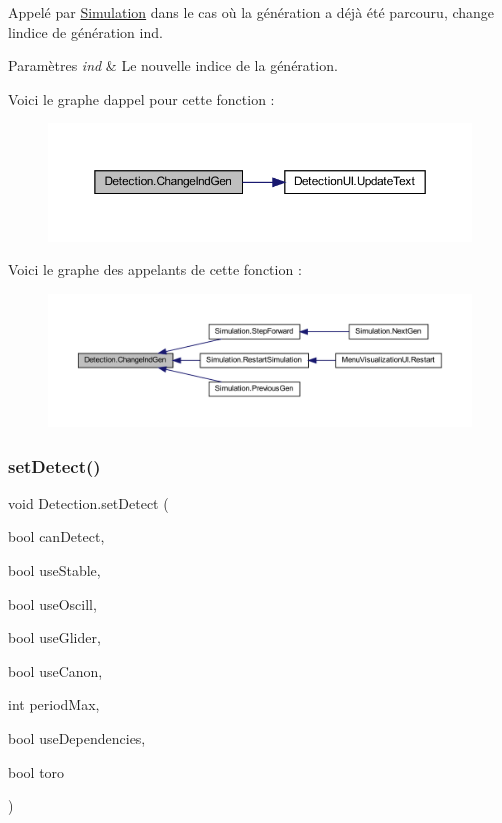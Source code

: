 Appelé par \mbox{\hyperlink{class_simulation}{Simulation}} dans le cas où la génération a déjà été parcouru, change l\textquotesingle{}indice de génération ind. 


\begin{DoxyParams}{Paramètres}
{\em ind} & Le nouvelle indice de la génération.\\
\hline
\end{DoxyParams}
Voici le graphe d\textquotesingle{}appel pour cette fonction \+:
\nopagebreak
\begin{figure}[H]
\begin{center}
\leavevmode
\includegraphics[width=350pt]{class_detection_a70084049883e8e2ebecce5d24e84a196_cgraph}
\end{center}
\end{figure}
Voici le graphe des appelants de cette fonction \+:
\nopagebreak
\begin{figure}[H]
\begin{center}
\leavevmode
\includegraphics[width=350pt]{class_detection_a70084049883e8e2ebecce5d24e84a196_icgraph}
\end{center}
\end{figure}
\mbox{\label{class_detection_a31fe39fdfc2f5b8c9e92bcfe1c5d6cc0}} 
\subsubsection{\texorpdfstring{set\+Detect()}{setDetect()}}
{\footnotesize\ttfamily void Detection.\+set\+Detect (\begin{DoxyParamCaption}\item[{bool}]{can\+Detect,  }\item[{bool}]{use\+Stable,  }\item[{bool}]{use\+Oscill,  }\item[{bool}]{use\+Glider,  }\item[{bool}]{use\+Canon,  }\item[{int}]{period\+Max,  }\item[{bool}]{use\+Dependencies,  }\item[{bool}]{toro }\end{DoxyParamCaption})\hspace{0.3cm}{\ttfamily [inline]}}



